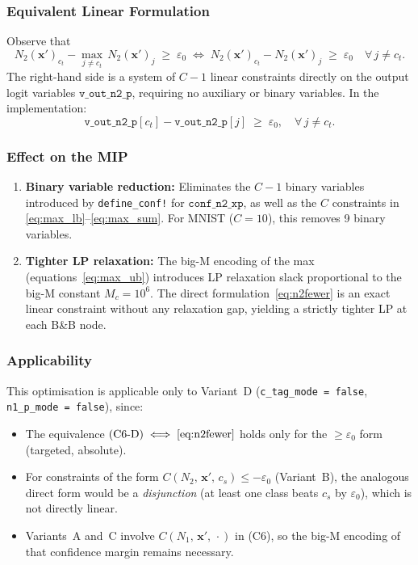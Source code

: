 \documentclass[11pt,a4paper]{article}
\theoremstyle{definition}
\theoremstyle{plain}
\newcommand{\Conf}[3]{C(#1,\,#2,\,#3)}
\newcommand{\NN}[1]{N_{#1}}
\newcommand{\vxp}{\mathbf{x}'}
\newcommand{\epszero}{\varepsilon_0}
\begin{document}
\subsubsection{Equivalent Linear Formulation}

Observe that
\[
  \NN{2}(\vxp)_{c_t} - \max_{j \ne c_t}\,\NN{2}(\vxp)_j \;\ge\; \epszero
  \;\iff\;
  \NN{2}(\vxp)_{c_t} - \NN{2}(\vxp)_j \;\ge\; \epszero \quad \forall\, j \ne c_t.
\]
The right-hand side is a system of $C-1$ linear constraints directly on the output logit variables $\mathtt{v\_out\_n2\_p}$, requiring no auxiliary or binary variables. In the implementation:
\begin{equation}
  \mathtt{v\_out\_n2\_p}[c_t] - \mathtt{v\_out\_n2\_p}[j] \;\ge\; \epszero, \quad \forall\, j \ne c_t. \label{eq:n2fewer}
\end{equation}

\subsubsection{Effect on the MIP}

\begin{enumerate}
  \item \textbf{Binary variable reduction:} Eliminates the $C-1$ binary variables introduced by \texttt{define\_conf!} for $\mathtt{conf\_n2\_xp}$, as well as the $C$ constraints in \eqref{eq:max_lb}--\eqref{eq:max_sum}. For MNIST ($C=10$), this removes 9 binary variables.
  \item \textbf{Tighter LP relaxation:} The big-M encoding of the max (equations~\eqref{eq:max_ub}) introduces LP relaxation slack proportional to the big-M constant $M_c = 10^6$. The direct formulation~\eqref{eq:n2fewer} is an exact linear constraint without any relaxation gap, yielding a strictly tighter LP at each B\&B node.
\end{enumerate}

\subsubsection{Applicability}

This optimisation is applicable only to Variant~D (\texttt{c\_tag\_mode = false}, \texttt{n1\_p\_mode = false}), since:
\begin{itemize}
  \item The equivalence $\text{(C6-D)} \iff \eqref{eq:n2fewer}$ holds only for the $\ge \epszero$ form (targeted, absolute).
  \item For constraints of the form $\Conf{\NN{2}}{\vxp}{c_s} \le -\epszero$ (Variant~B), the analogous direct form would be a \emph{disjunction} (at least one class beats $c_s$ by $\epszero$), which is not directly linear.
  \item Variants~A and~C involve $\Conf{\NN{1}}{\vxp}{\cdot}$ in (C6), so the big-M encoding of that confidence margin remains necessary.
\end{itemize}
\end{document}
